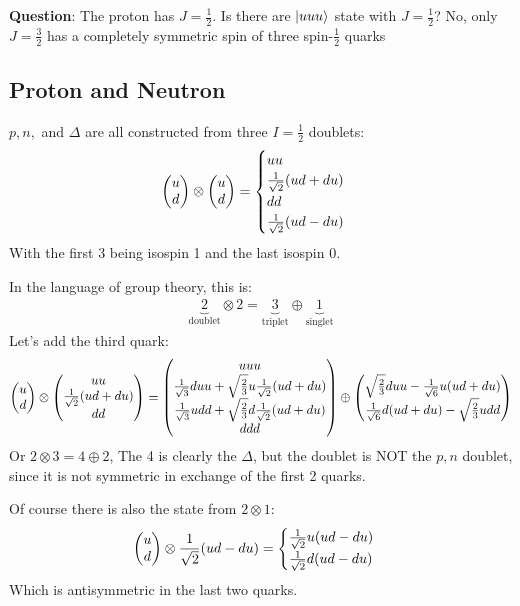 \textbf{Question}: The proton has $J=\frac12$. Is there are $\ket{uuu}$ state with $J=\frac12$? No, only $J=\frac32$ has a completely symmetric spin of three spin-$\frac12$ quarks

\subsection{Proton and Neutron}
$p,n,$ and $\Delta$ are all constructed from three $I=\frac12$ doublets:
\begin{align*}
  \pmqty{u\\d}\otimes\pmqty{u\\d}=
  \begin{cases}
    uu \\ \frac1{\sqrt{2}}(ud+du) \\ dd \\
    \frac1{\sqrt{2}}(ud-du)
  \end{cases}
\end{align*}
With the first 3 being isospin 1 and the last isospin 0.

In the language of group theory, this is:
\begin{align*}
  \underbrace{2}_{\text{doublet}}\otimes 2 = \underbrace{3}_{\text{triplet}}
  \oplus \underbrace{1}_{\text{singlet}}
\end{align*}
Let's add the third quark:
\begin{align*}
  \pmqty{u\\d}\otimes
  \pmqty{uu\\\frac1{\sqrt{2}}(ud+du)\\dd}
  =\pmqty{uuu\\\frac1{\sqrt{3}}duu+\sqrt{\frac23}u\frac1{\sqrt{2}}(ud+du)\\
    \frac1{\sqrt{3}}udd+\sqrt{\frac23}d\frac1{\sqrt{2}}(ud+du)\\ ddd}
  \oplus \pmqty{\sqrt{\frac23}duu-\frac1{\sqrt{6}}u(ud+du)\\
  \frac1{\sqrt{6}}d(ud+du)-\sqrt{\frac23}udd}
\end{align*}
Or $2\otimes3=4\oplus2$, The 4 is clearly the $\Delta$, but the doublet is NOT the $p,n$ doublet, since it is not symmetric in exchange of the first 2 quarks.

Of course there is also the state from $2\otimes 1$:
\begin{align*}
  \pmqty{u\\d}\otimes\frac1{\sqrt{2}}\qty(ud-du)=
  \begin{cases}
    \frac{1}{\sqrt{2}}u(ud-du)\\
    \frac{1}{\sqrt{2}}d(ud-du)
  \end{cases}
\end{align*}
Which is antisymmetric in the last two quarks.

